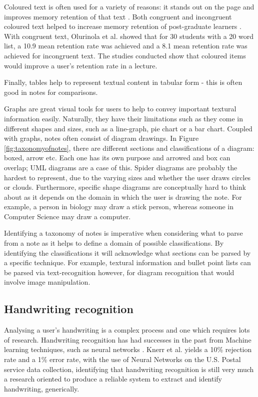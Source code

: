 Coloured text is often used for a variety of reasons: it stands out on the page and improves memory retention of that text \cite{citeulike:14014177}. Both congruent and incongruent  coloured text helped to increase memory retention of post-graduate learners \cite{Olurinola_Tayo_2015}. With congruent text, Olurinola et al. showed that for 30 students with a 20 word list, a 10.9 mean retention rate was achieved and a 8.1 mean retention rate was achieved for incongruent text. The studies conducted show that coloured items would improve a user's retention rate in a lecture.

Finally, tables help to represent textual content in tabular form - this is often good in notes for comparisons.

Graphs are great visual tools for users to help to convey important textural information easily. Naturally, they have their limitations such as they come in different shapes and sizes, such as a line-graph, pie chart or a bar chart. Coupled with graphs, notes often consist of diagram drawings.  In Figure \ref{fig:taxonomyofnotes}, there are different sections and classifications of a diagram: boxed, arrow etc. Each one has its own purpose and arrowed and box can overlap; UML diagrams are a case of this. Spider diagrams are probably the hardest to represent, due to the varying sizes and whether the user draws circles or clouds. Furthermore, specific shape diagrams are conceptually hard to think about as it depends on the domain in which the user is drawing the note. For example, a person in biology may draw a stick person, whereas someone in Computer Science may draw a computer.

Identifying a taxonomy of notes is imperative when considering what to parse from a note as it helps to define a domain of possible classifications. By identifying the classifications it will acknowledge what sections can be parsed by a specific technique. For example, textural information and bullet point lists can be parsed via text-recognition however, for diagram recognition that would involve image manipulation.


\subsection{Handwriting recognition}
Analysing a user's handwriting is a complex process and one which requires lots of research. Handwriting recognition has had successes in the past from Machine learning techniques, such as neural networks \cite{citeulike:13510433}. Knerr et al. yields a 10\% rejection rate and  a 1\% error rate, with the use of Neural Networks on the U.S. Postal service data collection, identifying that handwriting recognition is still very much a research oriented to produce a reliable system to extract and identify handwriting, generically.


